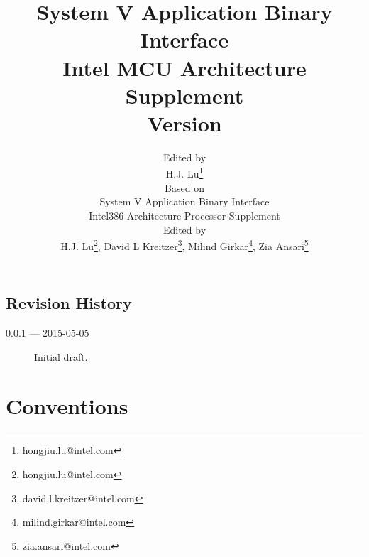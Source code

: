 \documentclass[12pt]{report}
\begin{document}
\author{Edited by\\
  H.J. Lu\thanks{hongjiu.lu@intel.com} \\
  \small
  Based on\\
  \small
  System V Application Binary Interface\\
  \small
  Intel386 Architecture Processor Supplement\\
  \small
  Edited by\\
  \small
  H.J. Lu\thanks{hongjiu.lu@intel.com},
  David L Kreitzer\thanks{david.l.kreitzer@intel.com},
  Milind Girkar\thanks{milind.girkar@intel.com},
  Zia Ansari\thanks{zia.ansari@intel.com}}

\title{System V Application Binary Interface\\
{\Large Intel MCU Architecture Supplement\\
Version \version}}
\maketitle
\tableofcontents
\listoftables
\listoffigures

\section*{Revision History}

\begin{description}

\item[0.0.1 --- 2015-05-05] Initial draft.
\end{description}







\chapter{Conventions}


\appendix

\end{document}
